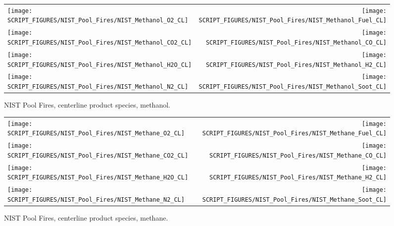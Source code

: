 \begin{figure}[p]
\begin{tabular*}{\textwidth}{l@{\extracolsep{\fill}}r}
\texttt{[image: SCRIPT\_FIGURES/NIST\_Pool\_Fires/NIST\_Methanol\_O2\_CL]} &
\texttt{[image: SCRIPT\_FIGURES/NIST\_Pool\_Fires/NIST\_Methanol\_Fuel\_CL]} \\
\texttt{[image: SCRIPT\_FIGURES/NIST\_Pool\_Fires/NIST\_Methanol\_CO2\_CL]} &
\texttt{[image: SCRIPT\_FIGURES/NIST\_Pool\_Fires/NIST\_Methanol\_CO\_CL]}    \\
\texttt{[image: SCRIPT\_FIGURES/NIST\_Pool\_Fires/NIST\_Methanol\_H2O\_CL]} &
\texttt{[image: SCRIPT\_FIGURES/NIST\_Pool\_Fires/NIST\_Methanol\_H2\_CL]} \\
\texttt{[image: SCRIPT\_FIGURES/NIST\_Pool\_Fires/NIST\_Methanol\_N2\_CL]} &
\texttt{[image: SCRIPT\_FIGURES/NIST\_Pool\_Fires/NIST\_Methanol\_Soot\_CL]}
\end{tabular*}
\caption[NIST Pool Fires, centerline product species, methanol]{NIST Pool Fires, centerline product species, methanol.}
\label{NIST_Pool_Fires_Methanol}
\end{figure}

\begin{figure}[p]
\begin{tabular*}{\textwidth}{l@{\extracolsep{\fill}}r}
\texttt{[image: SCRIPT\_FIGURES/NIST\_Pool\_Fires/NIST\_Methane\_O2\_CL]} &
\texttt{[image: SCRIPT\_FIGURES/NIST\_Pool\_Fires/NIST\_Methane\_Fuel\_CL]} \\
\texttt{[image: SCRIPT\_FIGURES/NIST\_Pool\_Fires/NIST\_Methane\_CO2\_CL]} &
\texttt{[image: SCRIPT\_FIGURES/NIST\_Pool\_Fires/NIST\_Methane\_CO\_CL]}    \\
\texttt{[image: SCRIPT\_FIGURES/NIST\_Pool\_Fires/NIST\_Methane\_H2O\_CL]} &
\texttt{[image: SCRIPT\_FIGURES/NIST\_Pool\_Fires/NIST\_Methane\_H2\_CL]} \\
\texttt{[image: SCRIPT\_FIGURES/NIST\_Pool\_Fires/NIST\_Methane\_N2\_CL]} &
\texttt{[image: SCRIPT\_FIGURES/NIST\_Pool\_Fires/NIST\_Methane\_Soot\_CL]}
\end{tabular*}
\caption[NIST Pool Fires, centerline product species, methane]{NIST Pool Fires, centerline product species, methane.}
\label{NIST_Pool_Fires_Methane}
\end{figure}


\clearpage


